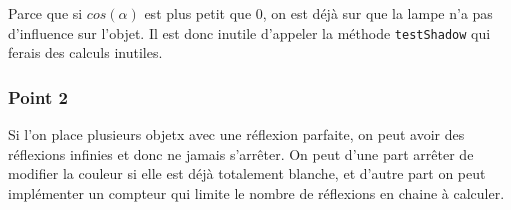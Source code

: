 Parce que si $cos(\alpha)$ est plus petit que $0$, on est déjà sur que la lampe n'a pas d'influence sur l'objet. Il est donc inutile d'appeler la méthode \texttt{testShadow} qui ferais des calculs inutiles.

\subsubsection{Point 2}

Si l'on place plusieurs objetx avec une réflexion parfaite, on peut avoir des réflexions infinies et donc ne jamais s'arrêter. On peut d'une part arrêter de modifier la couleur si elle est déjà totalement blanche, et d'autre part on peut implémenter un compteur qui limite le nombre de réflexions en chaine à calculer.